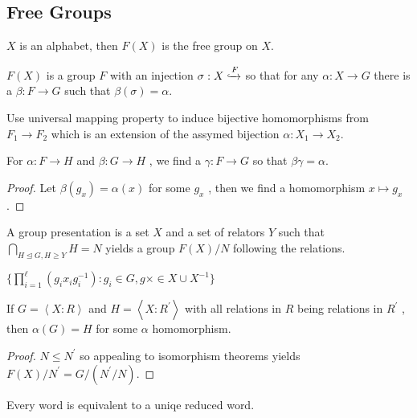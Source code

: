 \subsection{Free Groups}
\begin{definition}
	\(X\) is an alphabet, then \(F\left( X \right) \) is the free group on \(X\).
\end{definition}
\begin{theorem}
	\(F\left( X \right) \) is a group \(F\) with an injection \(\sigma : X \xhookrightarrow F\) so that for any \(\alpha : X \to G\) there is a \(\beta : F\to G\) such that \(\beta\left( \sigma \right) = \alpha\).
\end{theorem}
\begin{theorem}
Use universal mapping property to induce bijective homomorphisms from \(F_1 \to F_2\) which is an extension of the assymed bijection \(\alpha: X_1 \to X_2\).
\end{theorem}
\begin{theorem}
	For \(\alpha: F\to H\) and \(\beta: G\to H\) , we find a \(\gamma : F \to G\) so that \(\beta \gamma = \alpha\).
\end{theorem}
\begin{proof}
	Let \(\beta\left( g_{x} \right)  = \alpha\left( x \right) \) for some \(g_{x}\) , then we find a homomorphism \(x \mapsto g_{x}\).
\end{proof}
\begin{definition}
	A group presentation is a set \(X\) and a set of relators \(Y\) such that \(\bigcap_{H \trianglelefteq G, H \ge Y} H = N\) yields a group \(F\left( X \right)  / N\) following the relations.
\end{definition}
\begin{remark}
	\(\{\prod_{i= 1}^{\ell} \left( g_{i}x_{i}g_{i}^{-1} \right): g_{i} \in G, g\times \in X \cup X^{-1}  \} \)
\end{remark}
\begin{theorem}
	If \(G = \left<X : R \right> \) and \(H=\left<X : R^{\prime} \right> \) with all relations in \(R\) being relations in \(R^{\prime}\) , then \(\alpha\left( G \right) = H\) for some \(\alpha\) homomorphism.
\end{theorem}
\begin{proof}
	\(N \le N^{\prime}\) so appealing to isomorphism theorems yields \(F\left( X \right) / N^{\prime} = G / \left( N^{\prime} / N \right) \).
\end{proof}
\begin{theorem}
	Every word is equivalent to a uniqe reduced word.
\end{theorem}
